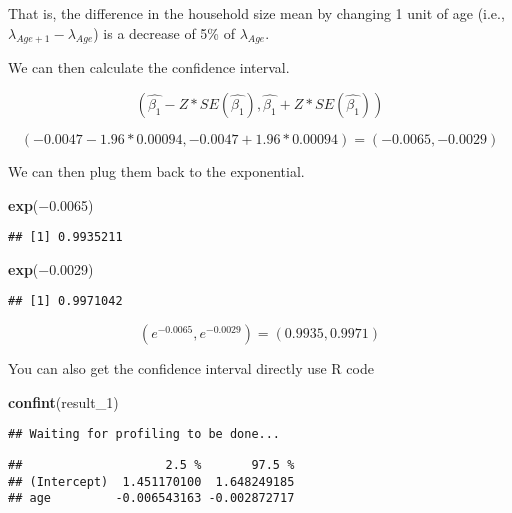 \documentclass[]{book}
\newenvironment{Shaded}{\begin{snugshade}}{\end{snugshade}}
\newcommand{\DecValTok}[1]{\textcolor[rgb]{0.00,0.00,0.81}{#1}}
\newcommand{\FloatTok}[1]{\textcolor[rgb]{0.00,0.00,0.81}{#1}}
\newcommand{\KeywordTok}[1]{\textcolor[rgb]{0.13,0.29,0.53}{\textbf{#1}}}
\newcommand{\NormalTok}[1]{#1}
\begin{document}
That is, the difference in the household size mean by changing 1 unit of age (i.e., \(\lambda_{Age+1} - \lambda_{Age}\)) is a decrease of 5\% of \(\lambda_{Age}\).

We can then calculate the confidence interval.

\[(\hat{\beta_1}-Z*SE(\hat{\beta_1}), \hat{\beta_1}+Z*SE(\hat{\beta_1}))\]

\[(-0.0047-1.96*0.00094,-0.0047+1.96*0.00094)=(−0.0065,−0.0029)\]

We can then plug them back to the exponential.

\begin{Shaded}
\begin{Highlighting}[]
\KeywordTok{exp}\NormalTok{(−}\FloatTok{0.0065}\NormalTok{)}
\end{Highlighting}
\end{Shaded}

\begin{verbatim}
## [1] 0.9935211
\end{verbatim}

\begin{Shaded}
\begin{Highlighting}[]
\KeywordTok{exp}\NormalTok{(−}\FloatTok{0.0029}\NormalTok{)}
\end{Highlighting}
\end{Shaded}

\begin{verbatim}
## [1] 0.9971042
\end{verbatim}

\[(e^{−0.0065},e^{−0.0029})=(0.9935,0.9971)\]

You can also get the confidence interval directly use R code

\begin{Shaded}
\begin{Highlighting}[]
\KeywordTok{confint}\NormalTok{(result_}\DecValTok{1}\NormalTok{)}
\end{Highlighting}
\end{Shaded}

\begin{verbatim}
## Waiting for profiling to be done...
\end{verbatim}

\begin{verbatim}
##                    2.5 %       97.5 %
## (Intercept)  1.451170100  1.648249185
## age         -0.006543163 -0.002872717
\end{verbatim}
\end{document}
